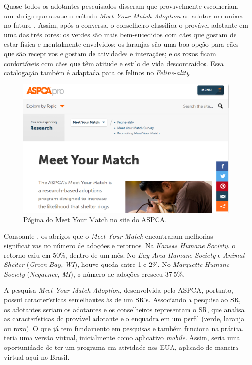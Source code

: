 \documentclass[portuguese]{textolivre}
\begin{document}
Quase todos os adotantes pesquisados disseram que provavelmente escolheriam um abrigo que usasse o método \textit{Meet Your Match Adoption} ao adotar um animal no futuro \cite{MYM:2017}. Assim, após a conversa, o conselheiro classifica o provável adotante em uma das três cores: os verdes são mais bem-sucedidos com cães que gostam de estar física e mentalmente envolvidos; os laranjas são uma boa opção para cães que são receptivos e gostam de atividades e interações; e os roxos ficam confortáveis com cães que têm atitude e estilo de vida descontraídos. Essa catalogação também é adaptada para os felinos no \textit{Feline-ality}.

\begin{figure}[H]
\centering
\includegraphics[scale=0.70]{imagens/fig-008.png}
\caption{Página do Meet Your Match no site do ASPCA.}
\label{fig:008}
\end{figure}

Consoante \textcite{MYM:2017}, os abrigos que o \textit{Meet Your Match} encontraram melhorias significativas no número de adoções e retornos. Na \textit{Kansas Humane Society}, o retorno caiu em 50\%, dentro de um mês. No \textit{Bay Area Humane Society} e \textit{Animal Shelter} (\textit{Green Bay, WI}), houve queda entre 1 e 2\%. No \textit{Marquette Humane Society} (\textit{Negaunee, MI}), o número de adoções cresceu 37,5\%. 

A pesquisa \textit{Meet Your Match Adoption}, desenvolvida pelo ASPCA, portanto, possui características semelhantes às de um SR's. Associando a pesquisa ao SR, os adotantes seriam os adotantes e os conselheiros representam o SR, que analisa as características do provável adotante e o enquadra em um perfil (verde, laranja ou roxo). O que já tem fundamento em pesquisas e também funciona na prática, teria uma versão virtual, inicialmente como aplicativo \textit{mobile}. Assim, seria uma oportunidade de ter um programa em atividade nos EUA, aplicado de maneira virtual aqui no Brasil.
\end{document}
